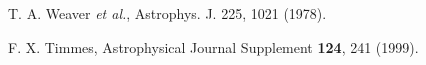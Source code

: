 \begin{thebibliography}{11}





 T. A. Weaver {\it et al.}, Astrophys. J. 225, 1021 (1978).

 F. X. Timmes, Astrophysical Journal Supplement {\bf 124}, 241 (1999).













\end{thebibliography}
 
 
 

 
